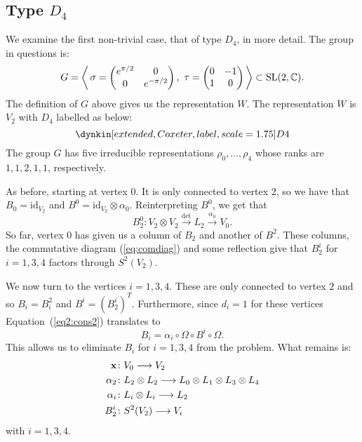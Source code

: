 \documentclass{amsart}
\theoremstyle{definition}
\begin{document}
\subsection{Type $D_4$}
We examine the first non-trivial case, that of type $D_4$, in more detail.
The group in questions is:
$$G= \left\langle \,\sigma=\begin{pmatrix} e^{\pi/2} & 0 \\ 0 & e^{-\pi/2} \end{pmatrix},\,\, \tau=\begin{pmatrix} 0 & -1 \\ 1 & 0 \end{pmatrix} \,\right\rangle \subset \operatorname{SL}(2, \mathbb{C}).$$
The definition of $G$ above gives us the representation $W$. The representation $W$ is $V_2$ with $D_4$ labelled as below:
\begin{equation*}
    \dynkin[extended,Coxeter,label,scale=1.75]D4{}
\end{equation*}
The group $G$ has five irreducible representations $\rho_0, \ldots, \rho_4$ whose ranks are $1,1,2,1,1$, respectively.

As before, starting at vertex $0$.
It is only connected to vertex $2$, so we have that $B_0=\text{id}_{V_2}$ and $B^0 = \text{id}_{V_2} \otimes \alpha_0$.
Reinterpreting $B^0$, we get that 
$$B_2^0 \colon V_2 \otimes V_2 \xrightarrow{\det} L_2 \xrightarrow{\alpha_0} V_0.$$
So far, vertex $0$ has given us a column of $B_2$ and another of $B^2$.
These columns, the commutative diagram (\ref{eq:comdiag}) and some reflection give that $B_2^i$ for $i=1,3,4$ factors through $S^2(V_2)$.

We now turn to the vertices $i=1,3,4$.
These are only connected to vertex $2$ and so $B_i=B_i^2$ and $B^i= (B_2^i)^T$.
Furthermore, since $d_i=1$ for these vertices Equation~(\ref{eq2:cons2}) translates to $$B_i = \alpha_i \circ \Omega \circ B^i \circ \Omega.$$
This allows us to eliminate $B_i$ for $i=1,3,4$ from the problem.
What remains is:
\begin{align*}
    \mathbf{x} \colon &V_0 \longrightarrow V_2 \\
    \alpha_2 \colon & L_2 \otimes L_2 \longrightarrow L_0 \otimes L_1 \otimes L_3 \otimes L_4 \\
    \alpha_i \colon &L_i \otimes L_i \longrightarrow L_2 \\
    B_2^i \colon &S^2(V_2) \longrightarrow V_i 
\end{align*}
with $i=1,3,4$.
\end{document}
